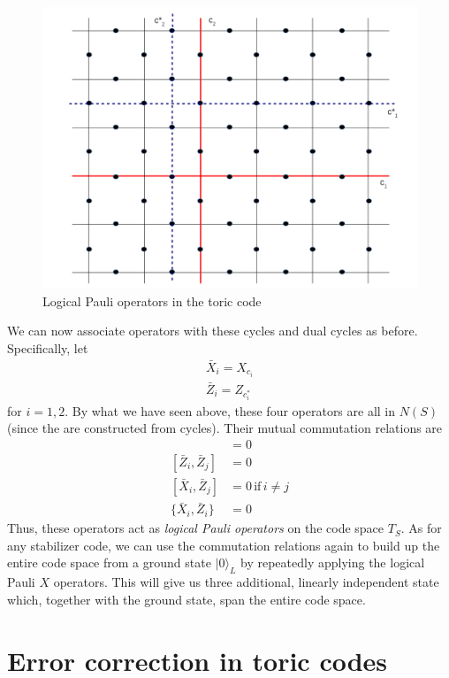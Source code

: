 \documentclass[a4paper, draft]{article}
\theoremstyle{own}
\theoremstyle{remark}
\begin{document}
\begin{figure}[ht]
\centering
\includegraphics[width=0.7\linewidth]{images/ToricCodeLogicalPauliMatrices}
\caption[Logical Pauli operators in the toric code]{Logical Pauli operators in the toric code}
\label{fig:ToricCodeLogicalPauliMatrices}
\end{figure}

We can now associate operators with these cycles and dual cycles as before. Specifically, let
\begin{align*}
\bar{X}_i = X_{c_i} \\
\bar{Z}_i = Z_{c^*_i} 
\end{align*}
for $i = 1,2$. By what we have seen above, these four operators are all in $N(S)$ (since the are constructed from cycles). Their mutual commutation relations are
\begin{align*}
[\bar{X}_i, \bar{X}_j] &= 0 \\
[\bar{Z}_i, \bar{Z}_j] &= 0 \\
[\bar{X}_i, \bar{Z}_j] &= 0 \, \text{if} \, i \neq j  \\
\{ \bar{X}_i, \bar{Z}_i \} &= 0 
\end{align*}
Thus, these operators act as \emph{logical Pauli operators} on the code space $T_S$. As for any stabilizer code, we can use the commutation relations again to build up the entire code space from a ground state $|0 \rangle_L$ by repeatedly applying the logical Pauli $X$ operators. This will give us three additional, linearly independent state which, together with the ground state, span the entire code space. 


\section{Error correction in toric codes}
\end{document}
